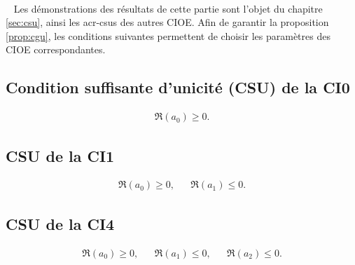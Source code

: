   {~}\\{~}
  Les démonstrations des résultats de cette partie sont l'objet du chapitre \ref{sec:csu}, ainsi les \glspl{acr-csu} des autres CIOE.
  Afin de garantir la proposition \ref{prop:cgu}, les conditions suivantes permettent de choisir les paramètres des CIOE correspondantes.

  \subsection{Condition suffisante d'unicité (CSU) de la CI0}
    \begin{align*}
      \Re(a_0) \ge 0.
    \end{align*}
  
  \subsection{CSU de la CI1}
    \begin{align*}
      \Re(a_0) \ge 0,&& \Re(a_1) \le 0.
    \end{align*}

  \subsection{CSU de la CI4}
    \begin{align*}
      \Re(a_0) \ge 0,&& \Re(a_1) \le 0,&& \Re(a_2) \le 0.
    \end{align*}



% 
